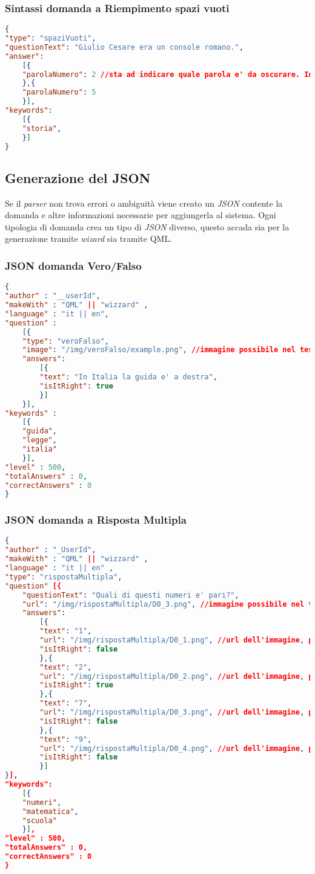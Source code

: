 \subsubsection{Sintassi domanda a Riempimento spazi vuoti}
\begin{lstlisting}[language=json,firstnumber=1]
{
"type": "spaziVuoti",
"questionText": "Giulio Cesare era un console romano.",
"answer":
	[{
	"parolaNumero": 2 //sta ad indicare quale parola e' da oscurare. In questo caso la numero 2
	},{
	"parolaNumero": 5
	}],
"keywords":
	[{
	"storia",
	}] 
}
\end{lstlisting}

\subsection{Generazione del JSON}
Se il \textit{parser} non trova errori o ambiguità viene creato un \textit{JSON} contente la domanda e altre informazioni necessarie per aggiungerla al sistema. Ogni tipologia di domanda crea un tipo di \textit{JSON} diverso, questo accada sia per la generazione tramite \textit{wizard} sia tramite QML.

\subsubsection{JSON domanda Vero/Falso}
\begin{lstlisting}[language=json,firstnumber=1]
{
"author" : "__userId",
"makeWith" : "QML" || "wizzard" ,
"language" : "it || en",
"question" :
	[{
	"type": "veroFalso",
	"image": "/img/veroFalso/example.png", //immagine possibile nel testo della domanda vero e falso
	"answers":
		[{
		"text": "In Italia la guida e' a destra",
		"isItRight": true
		}]
	}],
"keywords" : 
	[{
	"guida",
	"legge",
	"italia"
	}],
"level" : 500,
"totalAnswers" : 0,
"correctAnswers" : 0
}
\end{lstlisting}

\subsubsection{JSON domanda a Risposta Multipla}
\begin{lstlisting}[language=json,firstnumber=1]
{	
"author" : "_UserId",
"makeWith" : "QML" || "wizzard" ,
"language" : "it || en" ,
"type": "rispostaMultipla",
"question" [{
	"questionText": "Quali di questi numeri e' pari?",
	"url": "/img/rispostaMultipla/D0_3.png", //immagine possibile nel testo della domanda risposta multipla
	"answers":
		[{
		"text": "1",
		"url": "/img/rispostaMultipla/D0_1.png", //url dell'immagine, possibile campo facoltativo
		"isItRight": false
		},{
		"text": "2",
		"url": "/img/rispostaMultipla/D0_2.png", //url dell'immagine, possibile campo facoltativo
		"isItRight": true
		},{
		"text": "7",
		"url": "/img/rispostaMultipla/D0_3.png", //url dell'immagine, possibile campo facoltativo
		"isItRight": false
		},{
		"text": "9",
		"url": "/img/rispostaMultipla/D0_4.png", //url dell'immagine, possibile campo facoltativo
		"isItRight": false
		}]
}],
"keywords":
	[{
	"numeri",
	"matematica",
	"scuola"
	}],
"level" : 500,
"totalAnswers" : 0,
"correctAnswers" : 0
}
\end{lstlisting}

